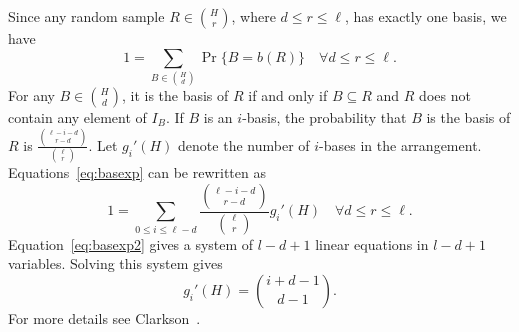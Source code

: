 \documentclass{patmorin}
\newtheorem{theorem}{Theorem}%
\begin{document}
Since any random sample $R \in \binom{H}{r}$, where $d \leq r \leq \ell$, has exactly one basis, we have
\begin{equation}
  \label{eq:basexp}
  1 = \sum_{B \in \binom{H}{d}} \Pr\{ B = b(R)\} \quad \forall d \leq r \leq \ell .
\end{equation}
 For any $B \in \binom{H}{d}$, it is the basis of $R$ if and only if $B \subseteq R$ and $R$ does not contain any element of $I_{B}$. If $B$ is an $i$-basis, the probability that $B$ is the basis of $R$ is $\frac{\binom{\ell-i-d}{r-d}}{\binom{\ell}{r}}$. Let $g_{i}'(H)$ denote the number of $i$-bases in the arrangement. Equations~\eqref{eq:basexp} can be rewritten as
 \begin{equation}
   \label{eq:basexp2}
   1 = \sum_{0 \leq i \leq \ell-d}\frac{\binom{\ell-i-d}{r-d}}{\binom{\ell}{r}}g_{i}'(H) \quad \forall d \leq r \leq \ell .
 \end{equation}
Equation~\eqref{eq:basexp2} gives a system of $l - d + 1$ linear equations in $l - d + 1$ variables. Solving this system gives
\begin{equation}
  \label{eq:numibasis}
  g_{i}'(H) = \binom{i+d-1}{d-1}.
\end{equation}
For more details see Clarkson~\cite{Clarkson93}.

\end{document}
